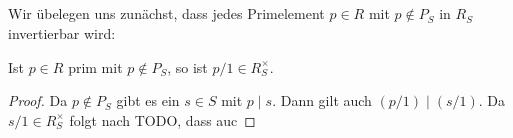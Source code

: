 \documentclass[a4paper,10pt,numbers=noenddot]{scrartcl}
\begin{document}
\subsection{}

Wir übelegen uns zunächst, dass jedes Primelement $p \in R$ mit $p \notin P_S$ in $R_S$ invertierbar wird:

\begin{claim}
  Ist $p \in R$ prim mit $p \notin P_S$, so ist $p/1 \in R_S^\times$.
\end{claim}
\begin{proof}
  Da $p \notin P_S$ gibt es ein $s \in S$ mit $p \mid s$.
  Dann gilt auch $(p/1) \mid (s/1)$.
  Da $s/1 \in R_S^\times $ folgt nach TODO, dass auc
\end{proof}












\section{}
\end{document}
